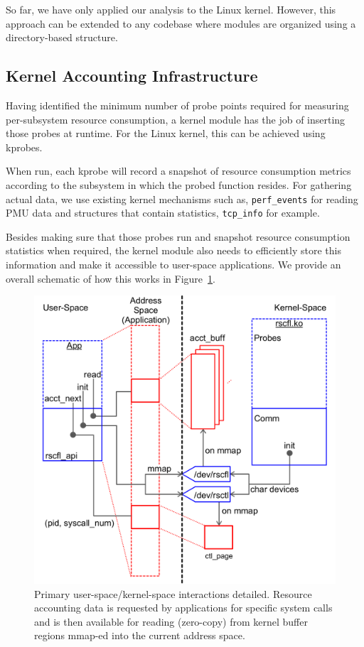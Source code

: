 \documentclass[letterpaper,twocolumn,10pt]{article}
\begin{document}
So far, we have only applied our analysis to the Linux kernel. However, this
approach can be extended to any codebase where modules are organized using a
directory-based structure.


\subsection{Kernel Accounting Infrastructure}

Having identified the minimum number of probe points required for measuring per-subsystem
resource consumption, a kernel module has the job of inserting those probes at runtime.
For the Linux kernel, this can be achieved using kprobes.

When run, each kprobe will record a snapshot of resource consumption metrics according
to the subsystem in which the probed function resides. For gathering actual data, we
use existing kernel mechanisms such as, \texttt{perf\_events} for reading PMU
data and structures that contain statistics, \texttt{tcp\_info} for example.

Besides making sure that those probes run and snapshot resource consumption statistics
when required, the kernel module also needs to efficiently store this information
and make it accessible to user-space applications. We provide an overall schematic of
how this works in Figure~\ref{fig:design}.

\begin{figure}[ht!] 
	\centering
	\hspace*{-0.05\columnwidth} 
	\includegraphics[width=1.1\columnwidth]{sys_design}
	\caption{Primary user-space/kernel-space interactions detailed. Resource
accounting data is requested by applications for specific system calls and is
then available for reading (zero-copy) from kernel buffer regions mmap-ed into
the current address space. } 
	\label{fig:design}
\end{figure}
\end{document}
